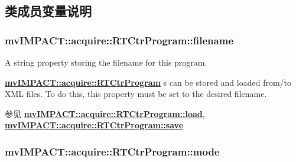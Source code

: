 \subsection{类成员变量说明}
\hypertarget{classmv_i_m_p_a_c_t_1_1acquire_1_1_r_t_ctr_program_ab43275f87f5032016f0ec4dfba643343}{
\subsubsection[{filename}]{ mv\+I\+M\+P\+A\+C\+T\+::acquire\+::\+R\+T\+Ctr\+Program\+::filename}}\label{classmv_i_m_p_a_c_t_1_1acquire_1_1_r_t_ctr_program_ab43275f87f5032016f0ec4dfba643343}


A string property storing the filename for this program. 

{\bfseries \hyperlink{classmv_i_m_p_a_c_t_1_1acquire_1_1_r_t_ctr_program}{mv\+I\+M\+P\+A\+C\+T\+::acquire\+::\+R\+T\+Ctr\+Program}} s can be stored and loaded from/to X\+M\+L files. To do this, this property must be set to the desired filename. \begin{DoxySeeAlso}{参见}
{\bfseries \hyperlink{classmv_i_m_p_a_c_t_1_1acquire_1_1_r_t_ctr_program_a349cc9c552585fe4d795b7655d9b3bde}{mv\+I\+M\+P\+A\+C\+T\+::acquire\+::\+R\+T\+Ctr\+Program\+::load}}, ~\newline
 {\bfseries \hyperlink{classmv_i_m_p_a_c_t_1_1acquire_1_1_r_t_ctr_program_a937c09b17d8343c2f7f3142abeeb836f}{mv\+I\+M\+P\+A\+C\+T\+::acquire\+::\+R\+T\+Ctr\+Program\+::save}} 
\end{DoxySeeAlso}
\hypertarget{classmv_i_m_p_a_c_t_1_1acquire_1_1_r_t_ctr_program_a6bce5448e7fcf2f383f829be831820eb}{
\subsubsection[{mode}]{ mv\+I\+M\+P\+A\+C\+T\+::acquire\+::\+R\+T\+Ctr\+Program\+::mode}}\label{classmv_i_m_p_a_c_t_1_1acquire_1_1_r_t_ctr_program_a6bce5448e7fcf2f383f829be831820eb}


